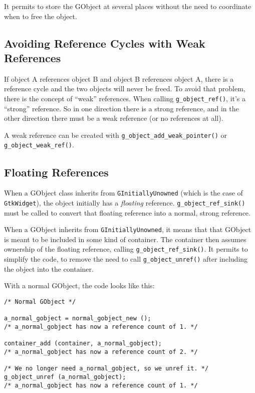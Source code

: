 It permits to store the GObject at several places without the need to coordinate when to free the object.

\subsection{Avoiding Reference Cycles with Weak References}

If object A references object B and object B references object A, there is a reference cycle and the two objects will never be freed. To avoid that problem, there is the concept of ``weak'' references. When calling \lstinline{g_object_ref()}, it's a ``strong'' reference. So in one direction there is a strong reference, and in the other direction there must be a weak reference (or no references at all).

A weak reference can be created with \lstinline{g_object_add_weak_pointer()} or \lstinline{g_object_weak_ref()}.


\subsection{Floating References}

When a GObject class inherits from \lstinline{GInitiallyUnowned} (which is the case of \lstinline{GtkWidget}), the object initially has a \emph{floating} reference. \lstinline{g_object_ref_sink()} must be called to convert that floating reference into a normal, strong reference.

When a GObject inherits from \lstinline{GInitiallyUnowned}, it means that that GObject is meant to be included in some kind of container. The container then assumes ownership of the floating reference, calling \lstinline{g_object_ref_sink()}. It permits to simplify the code, to remove the need to call \lstinline{g_object_unref()} after including the object into the container.

With a normal GObject, the code looks like this:
\begin{lstlisting}
/* Normal GObject */

a_normal_gobject = normal_gobject_new ();
/* a_normal_gobject has now a reference count of 1. */

container_add (container, a_normal_gobject);
/* a_normal_gobject has now a reference count of 2. */

/* We no longer need a_normal_gobject, so we unref it. */
g_object_unref (a_normal_gobject);
/* a_normal_gobject has now a reference count of 1. */
\end{lstlisting}

